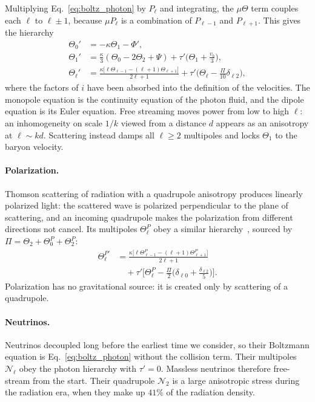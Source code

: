 Multiplying Eq.~\eqref{eq:boltz_photon} by $P_\ell$ and integrating, the $\mu\Theta$ term couples each $\ell$ to
$\ell\pm1$, because $\mu P_\ell$ is a combination of $P_{\ell-1}$ and $P_{\ell+1}$. This gives the hierarchy
\begin{align}
\Theta_0' &= -\kappa\Theta_1 - \Phi', \\
\Theta_1' &= \frac{\kappa}{3}(\Theta_0 - 2\Theta_2 + \Psi) + \tau'\Big(\Theta_1 + \frac{v_b}{3}\Big), \\
\Theta_\ell' &= \frac{\kappa\big[\ell\Theta_{\ell-1} - (\ell+1)\Theta_{\ell+1}\big]}{2\ell+1}
               + \tau'\Big(\Theta_\ell - \frac{\Pi}{10}\delta_{\ell2}\Big),
\end{align}
where the factors of $i$ have been absorbed into the definition of the velocities. The monopole equation is the
continuity equation of the photon fluid, and the dipole equation is its Euler equation. Free streaming moves power from
low to high $\ell$: an inhomogeneity on scale $1/k$ viewed from a distance $d$ appears as an anisotropy at
$\ell\sim kd$. Scattering instead damps all $\ell\ge2$ multipoles and locks $\Theta_1$ to the baryon velocity.

\paragraph*{Polarization.} Thomson scattering of radiation with a quadrupole anisotropy produces linearly polarized
light: the scattered wave is polarized perpendicular to the plane of scattering, and an incoming quadrupole makes
the polarization from different directions not cancel. Its multipoles $\Theta^P_\ell$ obey a similar
hierarchy~\cite{Zaldarriaga1995}, sourced by $\Pi=\Theta_2+\Theta^P_0+\Theta^P_2$:
\begin{align}
\Theta^{P\prime}_\ell &= \frac{\kappa\big[\ell\Theta^P_{\ell-1} - (\ell+1)\Theta^P_{\ell+1}\big]}{2\ell+1} \nonumber\\
      &\quad + \tau'\Big[\Theta^P_\ell - \frac{\Pi}{2}\Big(\delta_{\ell0}+\frac{\delta_{\ell2}}{5}\Big)\Big].
\end{align}
Polarization has no gravitational source: it is created only by scattering of a quadrupole.

\paragraph*{Neutrinos.} Neutrinos decoupled long before the earliest time we consider, so their Boltzmann equation is
Eq.~\eqref{eq:boltz_photon} without the collision term. Their multipoles $\mathcal{N}_\ell$ obey the photon hierarchy
with $\tau'=0$. Massless neutrinos therefore free-stream from the start. Their quadrupole $\mathcal{N}_2$ is a large
anisotropic stress during the radiation era, when they make up $41\%$ of the radiation density.

